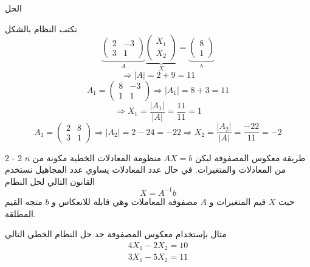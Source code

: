 	\begin{frame}
		\begin{exampleblock}{الحل}
			
			نكتب النظام بالشكل
			\[
			\underbrace{
				\begin{pmatrix}
					2&-3\\
					3&1
			\end{pmatrix}}_{A}
			\underbrace{
				\begin{pmatrix}
					X_1\\X_2
			\end{pmatrix}}_{X}
			=
			\underbrace{
				\begin{pmatrix}
					8\\1
			\end{pmatrix}}_{b}
			\]
			\[
			\Rightarrow |A| = 2+9=11
			\]
			\[
			A_1 =
			\begin{pmatrix}
				8&-3\\
				1&1
			\end{pmatrix}
			\Rightarrow |A_1| = 8+3=11
			\]
			\[
			\Rightarrow X_1 = \frac{|A_1|}{|A|} = \frac{11}{11}=1
			\]
			\[
			A_1 =
			\begin{pmatrix}
				2&8\\
				3&1
			\end{pmatrix}
			\Rightarrow |A_2| = 2-24=-22
			\Rightarrow X_2 = \frac{|A_2|}{|A|} = \frac{-22}{11} = -2
			\]
		\end{exampleblock}
	\end{frame}
	
	\begin{frame}
		\begin{exampleblock}{2 - 2 طريقة معكوس المصفوفة}
			ليكن $AX=b$ منظومة المعادلات الخطية مكونة من $n$ من المعادلات والمتغيرات. في حال عدد المعادلات يساوي عدد المجاهيل نستخدم القانون التالي لحل النظام
			\[
			X = A^{-1}b
			\]
			حيث $X$ قيم المتغيرات و $A$ مصفوفة المعاملات وهي قابلة للانعكاس و $b$ متجه القيم المطلقة.
		\end{exampleblock}
		
		\begin{exampleblock}{مثال}
			بإستخدام معكوس المصفوفة جد حل النظام الخطي التالي
			\begin{align*}
				4X_1 - 2X_2 = 10\\
				3X_1 - 5X_2 = 11
			\end{align*}
		\end{exampleblock}
	\end{frame}
	
